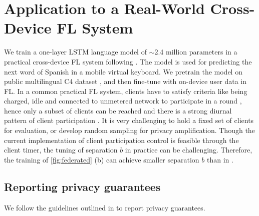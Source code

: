 \documentclass{article}
\begin{document}
\section{Application to a Real-World Cross-Device FL System}\label{sec:production-detail}
We train a one-layer LSTM language model of $\sim$2.4 million parameters in a practical cross-device FL system following \citep{xu2023gboard}
. 
The model is used for predicting the next word of Spanish in a mobile virtual keyboard. We pretrain the model on public multilingual C4 dataset \citep{raffel2020t5,xue2020mt5}, and then fine-tune with on-device user data in FL. In a common practical FL system, clients have to satisfy criteria like being charged, idle and connected to unmetered network to participate in a round \citep{NWP18,bonawitz2019towards,paulik2021federated,huba2022papaya}, hence only a subset of clients can be reached and there is a strong diurnal pattern of client participation \citep{yang2018applied,zhu2022diurnal}. It is very challenging to hold a fixed set of clients for evaluation, or develop random sampling for privacy amplification. Though the current implementation of client participation control is feasible through the client timer, the tuning of separation $b$ in practice can be challenging. Therefore, the training of \cref{fig:federated} (b) can achieve smaller separation $b$ than in \citep{xu2023gboard}.

\subsection{Reporting privacy guarantees}\label{sec:privacy-guarantees}
We follow the guidelines outlined in \citep[Sec. 5.3]{ponomareva2023dpfy} to report privacy guarantees.
\end{document}
